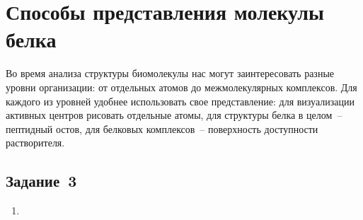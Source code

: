\section{Способы представления молекулы белка}
Во время анализа структуры биомолекулы нас могут заинтересовать разные уровни
организации: от отдельных атомов до межмолекулярных комплексов. Для каждого из уровней удобнее использовать свое представление:
для визуализации активных центров рисовать отдельные атомы, для структуры белка в целом~-- пептидный остов, для белковых
комплексов~-- поверхность доступности растворителя.

\subsection*{Задание~3}
\begin{enumerate}
    \item 
\end{enumerate}
